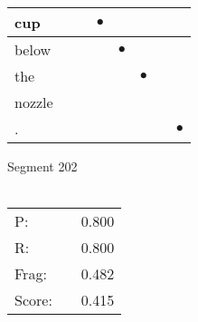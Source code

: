 \documentclass[landscape]{article}
\newcommand{\ssp}{\hspace{2pt}}
\newcommand{\mex}{\cellcolor{g}$\bullet$}
\begin{document}
\begin{tabular}{|l|p{10pt}|p{10pt}|p{10pt}|p{10pt}|p{10pt}|p{10pt}|p{10pt}|}
\hline
\ssp \cellcolor{ref2}cup \ssp&\hspace{2pt}&\hspace{2pt}&\hspace{2pt}\mex&\hspace{2pt}&\hspace{2pt}&\hspace{2pt}&\hspace{2pt}\\
\hline
\ssp \cellcolor{ref3}below \ssp&\hspace{2pt}&\hspace{2pt}&\hspace{2pt}&\hspace{2pt}\mex&\hspace{2pt}&\hspace{2pt}&\hspace{2pt}\\
\hline
\ssp \cellcolor{ref4}the \ssp&\hspace{2pt}&\hspace{2pt}&\hspace{2pt}&\hspace{2pt}&\hspace{2pt}\mex&\hspace{2pt}&\hspace{2pt}\\
\hline
\ssp nozzle \ssp&\hspace{2pt}&\hspace{2pt}&\hspace{2pt}&\hspace{2pt}&\hspace{2pt}&\hspace{2pt}&\hspace{2pt}\\
\hline
\ssp \cellcolor{ref6}. \ssp&\hspace{2pt}&\hspace{2pt}&\hspace{2pt}&\hspace{2pt}&\hspace{2pt}&\hspace{2pt}&\hspace{2pt}\mex\\
\hline
\end{tabular}

\vspace{6pt}
\noindent Segment 202\\\\
\noindent\begin{tabular}{lm{12pt}r}
\hline
P:&&0.800\\
R:&&0.800\\
Frag:&&0.482\\
Score:&&0.415\\
\end{tabular}
\end{document}
